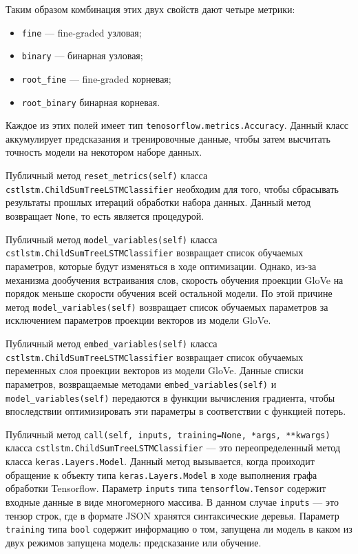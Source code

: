 Таким образом комбинация этих двух свойств дают четыре метрики:
\begin{itemize}
\item \texttt{fine} --- fine-graded узловая;
\item \texttt{binary} --- бинарная узловая;
\item \texttt{root\_fine} --- fine-graded корневая;
\item \texttt{root\_binary} бинарная корневая.
\end{itemize}

Каждое из этих полей имеет тип \texttt{tenosorflow.metrics.Accuracy}. Данный класс аккумулирует предсказания и тренировочные данные, чтобы затем высчитать точность модели на некотором наборе данных.

Публичный метод \texttt{reset\_metrics(self)} класса \texttt{cstlstm.ChildSumTreeLSTMClassifier} необходим для того, чтобы сбрасывать результаты прошлых итераций обработки набора данных. Данный метод возвращает \texttt{None}, то есть является процедурой.

Публичный метод \texttt{model\_variables(self)} класса \texttt{cstlstm.ChildSumTreeLSTMClassifier} возвращает список обучаемых параметров, которые будут изменяться в ходе оптимизации. Однако, из-за механизма дообучения встраивания слов, скорость обучения проекции GloVe на порядок меньше скорости обучения всей остальной модели. По этой причине метод \texttt{model\_variables(self)} возвращает список обучаемых параметров за исключением параметров проекции векторов из модели GloVe.

Публичный метод \texttt{embed\_variables(self)} класса \texttt{cstlstm.ChildSumTreeLSTMClassifier} возвращает список обучаемых переменных слоя проекции векторов из модели GloVe. Данные списки параметров, возвращаемые методами \texttt{embed\_variables(self)} и \texttt{model\_variables(self)} передаются в функции вычисления градиента, чтобы впоследствии оптимизировать эти параметры в соответствии с функцией потерь.

Публичный метод \texttt{call(self, inputs, training=None, *args, **kwargs)} класса \texttt{cstlstm.ChildSumTreeLSTMClassifier} --- это переопределенный метод класса \texttt{keras.Layers.Model}. Данный метод вызывается, когда проиходит обращение к объекту типа \texttt{keras.Layers.Model} в ходе выполнения графа обработки Tensorflow. Параметр \texttt{inputs} типа \texttt{tensorflow.Tensor} содержит входные данные в виде многомерного массива. В данном случае \texttt{inputs} --- это тензор строк, где в формате JSON хранятся синтаксические деревья. Параметр \texttt{training} типа \texttt{bool} содержит информацию о том, запущена ли модель в каком из двух режимов запущена модель: предсказание или обучение.


